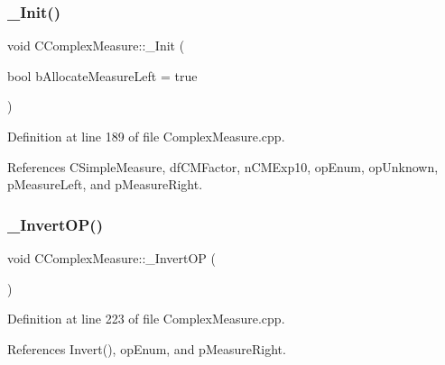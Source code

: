 \subsubsection{\texorpdfstring{\+\_\+\+Init()}{\_Init()}}
{\footnotesize\ttfamily void C\+Complex\+Measure\+::\+\_\+\+Init (\begin{DoxyParamCaption}\item[{bool}]{b\+Allocate\+Measure\+Left = {\ttfamily true} }\end{DoxyParamCaption})\hspace{0.3cm}{\ttfamily [protected]}}



Definition at line 189 of file Complex\+Measure.\+cpp.



References C\+Simple\+Measure, df\+C\+M\+Factor, n\+C\+M\+Exp10, op\+Enum, op\+Unknown, p\+Measure\+Left, and p\+Measure\+Right.

\mbox{\label{classCComplexMeasure_a6f071c1bd1340fea78a2aa90d1b6496f}} 
\subsubsection{\texorpdfstring{\+\_\+\+Invert\+O\+P()}{\_InvertOP()}}
{\footnotesize\ttfamily void C\+Complex\+Measure\+::\+\_\+\+Invert\+OP (\begin{DoxyParamCaption}{ }\end{DoxyParamCaption})\hspace{0.3cm}{\ttfamily [protected]}}



Definition at line 223 of file Complex\+Measure.\+cpp.



References Invert(), op\+Enum, and p\+Measure\+Right.

\mbox{\label{classCComplexMeasure_abd62182294ebd217cdd9af40d0af7e38}} 
